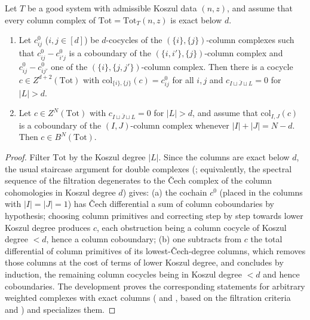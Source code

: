 \begin{lemma}\label{pf:hlf-chart:glue}
Let $T$ be a good system with admissible Koszul data $(n,z)$, and assume that every column complex of $\mathrm{Tot}=\mathrm{Tot}_T(n,z)$ is exact
below $d$.
\begin{enumerate}[label=\textup{(\alph*)},nosep]
\item Let $c^0_{ij}$ ($i,j\in[d]$) be $d$-cocycles of the $(\{i\},\{j\})$-column complexes such that $c^0_{ij}-c^0_{i'j}$ is a coboundary of the
  $(\{i,i'\},\{j\})$-column complex and $c^0_{ij}-c^0_{ij'}$ one of the $(\{i\},\{j,j'\})$-column complex. Then there is a cocycle
  $c\in Z^{d+2}(\mathrm{Tot})$ with $\mathrm{col}_{\{i\},\{j\}}(c)=c^0_{ij}$ for all $i,j$ and $c_{I\sqcup\bar J\sqcup L}=0$ for $|L|>d$.
\item Let $c\in Z^N(\mathrm{Tot})$ with $c_{I\sqcup\bar J\sqcup L}=0$ for $|L|>d$, and assume that $\mathrm{col}_{I,J}(c)$ is a coboundary of the
  $(I,J)$-column complex whenever $|I|+|J|=N-d$. Then $c\in B^N(\mathrm{Tot})$.
\end{enumerate}
\end{lemma}

\begin{proof}
Filter $\mathrm{Tot}$ by the Koszul degree $|L|$. Since the columns are exact below $d$, the usual staircase argument for double complexes
(\cite[\S5.6]{Weibel1994}; equivalently, the spectral sequence of the filtration degenerates to the \v{C}ech complex of the column cohomologies
in Koszul degree $d$) gives: (a) the cochain $c^0$ (placed in the columns with $|I|=|J|=1$) has \v{C}ech differential a sum of column
coboundaries by hypothesis; choosing column primitives and correcting step by step towards lower Koszul degree produces $c$, each obstruction
being a column cocycle of Koszul degree $<d$, hence a column coboundary; (b) one subtracts from $c$ the total differential of column primitives of
its lowest-\v{C}ech-degree columns, which removes those columns at the cost of terms of lower Koszul degree, and concludes by induction, the
remaining column cocycles being in Koszul degree $<d$ and hence coboundaries. The development proves the corresponding statements for arbitrary
weighted complexes with exact columns ( and , based on the filtration criteria  and )
and specializes them.
\end{proof}

